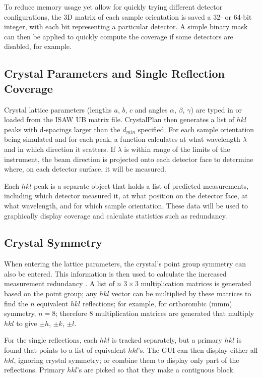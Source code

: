 \documentclass[final]{iucr}              %
\begin{document}
To reduce memory usage yet allow for quickly trying different detector
configurations, the 3D matrix of each sample orientation is saved a 32- or
64-bit integer, with each bit representing a particular detector. A simple
binary mask can then be applied to quickly compute the coverage if some
detectors are disabled, for example.          




\subsection{Crystal Parameters and Single Reflection Coverage}

Crystal lattice parameters (lengths $a$, $b$, $c$ and angles $\alpha$, $\beta$,
$\gamma$) are typed in or loaded from the ISAW UB matrix file. CrystalPlan then
generates a list of $hkl$ peaks with d-spacings larger than the $d_{min}$
specified. For each sample orientation being simulated and for each peak, a function calculates at
what wavelength $\lambda$ and in which direction it scatters. If $\lambda$ 
is within range of the limits of the instrument, the beam direction is projected
onto each detector face to determine where, on each detector surface, it will be
measured. 
 
Each $hkl$ peak is a separate object that holds a list of predicted
measurements, including which detector measured it, at what position on the
detector face, at what wavelength, and for which sample orientation. These data
will be used to  graphically display coverage and calculate statistics such as
redundancy. 



\subsection{Crystal Symmetry}

When entering the lattice parameters, the crystal's point group symmetry can
also be entered. This information is then used to calculate the increased
measurement redundancy \cite{giacovazzo92}. A list of $n$ $3\times3$
multiplication matrices is generated based on the point group; any $hkl$ vector can be multiplied by
these matrices to find the $n$ equivalent $hkl$ reflections; for example, for
orthorombic (mmm) symmetry, $n=8$; therefore 8 multiplication matrices are
generated that multiply $hkl$ to give $\pm h$, $\pm k$, $\pm l$.              

For the single reflections, each $hkl$ is tracked separately, but a primary
$hkl$ is found that points to a list of equivalent $hkl$'s. The GUI can
then display either all $hkl$, ignoring crystal symmetry; or combine them to
display only part of the reflections. Primary $hkl$'s
are picked so that they make a contiguous block. 
\end{document}
